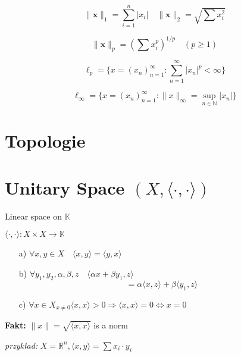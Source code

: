 \documentclass{article}
\begin{document}
$$\|\mathbf{x}\|_1 = \sum_{i=1}^{n} |x_i| \quad \|\mathbf{x}\|_2 = \sqrt{\sum x_i^2}$$

$$\|\mathbf{x}\|_p = \left(\sum x_i^p\right)^{1/p} \quad (p \geq 1)$$

$$\ell_p = \{x = (x_n)_{n=1}^{\infty} : \sum_{n=1}^{\infty} |x_n|^p < \infty\}$$

$$\ell_\infty = \{x = (x_n)_{n=1}^{\infty} : \|x\|_\infty = \sup_{n \in \mathbb{N}} |x_n|\}$$


\section*{Topologie}

\begin{center}
\end{center}

\section{Unitary Space $(X, \langle \cdot, \cdot \rangle)$}

\begin{center}
Linear space on $\mathbb{K}$
\end{center}

$\langle \cdot, \cdot \rangle: X \times X \to \mathbb{K}$

\begin{enumerate}
\item[a)] $\forall x,y \in X \quad \langle x,y \rangle = \langle y, x \rangle$

\item[b)] $\forall y_1, y_2, \alpha, \beta, z \quad \langle \alpha x + \beta y_1, z \rangle$
\[ = \alpha \langle x, z \rangle + \beta \langle y_1, z \rangle \]

\item[c)] $\forall x \in X_{x \neq 0} \langle x, x \rangle > 0 \Rightarrow \langle x, x \rangle = 0 \Leftrightarrow x = 0$
\end{enumerate}

\vspace{0.5cm}
\textbf{Fakt:} $\|x\| = \sqrt{\langle x, x \rangle}$ is a norm

\vspace{0.5cm}
\textit{przykład:} $X = \mathbb{R}^n, \langle x, y \rangle = \sum x_i \cdot y_i$
\end{document}

